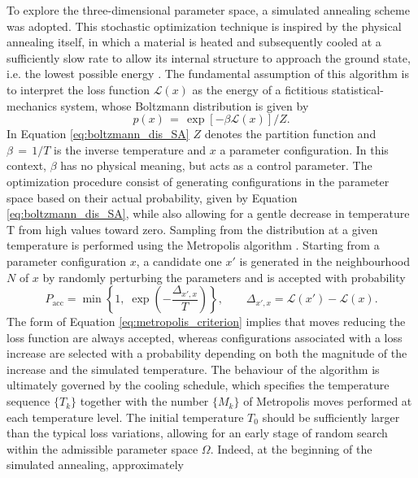 To explore the three-dimensional parameter space, a simulated annealing scheme was adopted. This stochastic optimization technique is inspired by the 
physical annealing itself, in which a material is heated and subsequently cooled at a sufficiently slow rate to allow its internal structure 
to approach the ground state, i.e. the lowest possible energy \parencite{SA_1}. The fundamental assumption of this algorithm is to 
interpret the loss function $\mathcal{L}\left(x\right)$ as the energy of a fictitious statistical-mechanics system, whose Boltzmann 
distribution is given by
\begin{equation}
    p\left(x\right)\,=\,\exp[-\beta \mathcal{L} \left(x\right)]/Z.
    \label{eq:boltzmann_dis_SA}
\end{equation}
In Equation \eqref{eq:boltzmann_dis_SA} $Z$ denotes the partition function and $\beta\,=\,1/T$ is the inverse temperature and $x$ a parameter configuration. 
In this context, $\beta$ has no physical meaning, but acts as a control parameter. The optimization procedure consist of generating configurations 
in the parameter space based on their actual probability, given by Equation \eqref{eq:boltzmann_dis_SA}, while also allowing for a 
gentle decrease in temperature T from high values toward zero. Sampling from the distribution at a given temperature is performed 
using the Metropolis algorithm \parencite{Metropolis}. Starting from a parameter configuration $x$, a candidate one $x'$ is generated in 
the neighbourhood $N$ of $x$ by randomly perturbing the parameters and is accepted with probability 
\begin{equation}
    P_{\mathrm{acc}} = \min\left\{1,\; \exp\left(-\frac{\Delta_{x',x}}{T}\right)\right\},
    \qquad \Delta_{x',x} = \mathcal{L}(x') - \mathcal{L}(x).
    \label{eq:metropolis_criterion}
\end{equation}
The form of Equation \eqref{eq:metropolis_criterion} implies that moves reducing the loss function are always accepted, whereas 
configurations associated with a loss increase are selected with a probability depending on both the magnitude of the increase and 
the simulated temperature. The behaviour of the algorithm is ultimately governed by the cooling schedule, which specifies the 
temperature sequence $\{T_k\}$ together with the number $\{M_k\}$ of Metropolis moves performed at each temperature level. 
The initial temperature $T_0$ should be sufficiently larger than the typical loss variations, allowing for an early stage of 
random search within the admissible parameter space $\Omega$. Indeed, at the beginning of the simulated annealing, approximately 
